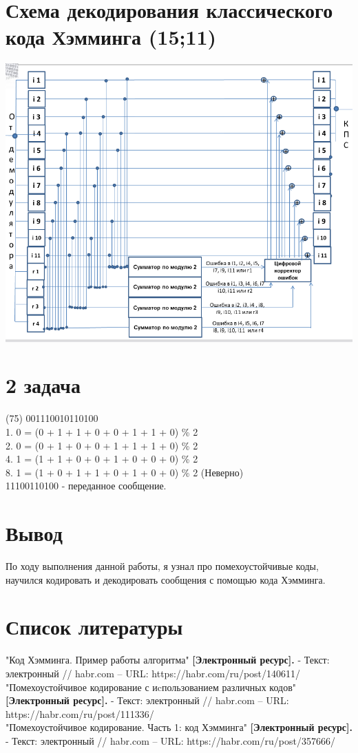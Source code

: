 \documentclass[12pt,onecolumn]{article}
\begin{document}
\section{Схема декодирования классического кода Хэмминга (15;11)}
\includegraphics[width=15cm]{img/img2.png}
\newpage
\section{2 задача}
(75) 001110010110100 \\
   1. 0 = (0 + 1 + 1 + 0 + 0 + 1 + 1 + 0) \% 2\\
   2. 0 = (0 + 1 + 0 + 0 + 1 + 1 + 1 + 0) \% 2\\
   4. 1 = (1 + 1 + 0 + 0 + 1 + 0 + 0 + 0) \% 2 \\
   8. 1 = (1 + 0 + 1 + 1 + 0 + 1 + 0 + 0) \% 2 (Неверно) \\ 
   11100110100 - переданное сообщение.
\newpage
\section{Вывод}
По ходу выполнения данной работы, я узнал про помехоустойчивые коды, научился кодировать и декодировать сообщения с помощью кода Хэмминга.
\newpage
\section{Список литературы}
"Код Хэмминга. Пример работы алгоритма" \textbf{[Электронный ресурс].} - Текст: электронный // habr.com – URL: https://habr.com/ru/post/140611/ \\
"Помехоустойчивое кодирование с иcпользованием различных кодов" \textbf{[Электронный ресурс].} - Текст: электронный // habr.com – URL: https://habr.com/ru/post/111336/ \\
"Помехоустойчивое кодирование. Часть 1: код Хэмминга" \textbf{[Электронный ресурс].} - Текст: электронный // habr.com – URL: https://habr.com/ru/post/357666/
\end{document}
